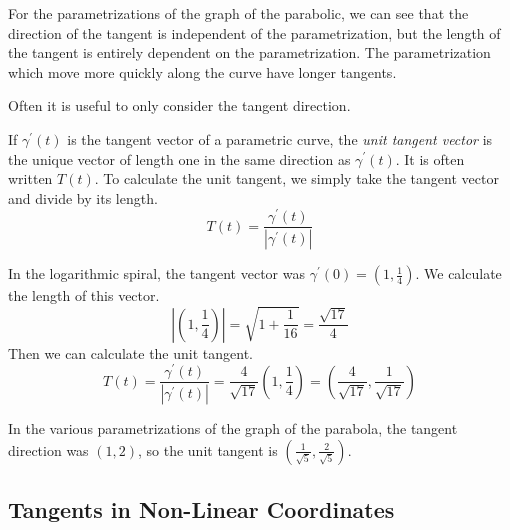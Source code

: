 \documentclass[fleqn,letterpaper]{report}
\begin{document}
For the parametrizations of the graph of the parabolic, we can
see that the direction of the tangent is independent of the
parametrization, but the length of the tangent is entirely
dependent on the parametrization. The parametrization which
move more quickly along the curve have longer tangents.

Often it is useful to only consider the tangent direction. 

\begin{defn}
If $\gamma^\prime(t)$ is the tangent vector of a parametric
curve, the \emph{unit tangent vector} is the unique vector of
length one in the same direction as $\gamma^\prime(t)$. It is
often written $T(t)$. To calculate the unit tangent, we simply
take the tangent vector and divide by its length.
\begin{equation*}
T(t) = \frac{\gamma^\prime(t)}{|\gamma^\prime(t)|}
\end{equation*}
\end{defn}

\begin{example}
In the logarithmic spiral, the tangent vector was $\gamma^\prime(0) =
(1, \frac{1}{4})$. We calculate the length of this vector.
\begin{equation*}
\left|\left(1,\frac{1}{4}\right)\right| = \sqrt{ 1 +
\frac{1}{16}} = \frac{\sqrt{17}}{4}
\end{equation*}
Then we can calculate the unit tangent.
\begin{equation*}
T(t) = \frac{\gamma^\prime(t)}{|\gamma^\prime(t)|} =
\frac{4}{\sqrt{17}}\left( 1, \frac{1}{4} \right) = \left(
\frac{4}{\sqrt{17}},\frac{1}{\sqrt{17}} \right) 
\end{equation*}
\end{example}

\begin{example}
In the various parametrizations of the graph of the
parabola, the tangent direction was $(1,2)$, so the unit
tangent is $\left( \frac{1}{\sqrt{5}},
\frac{2}{\sqrt{5}} \right)$.
\end{example}

\subsection{Tangents in Non-Linear Coordinates}
\label{tangents-non-linear-coords}
\end{document}
